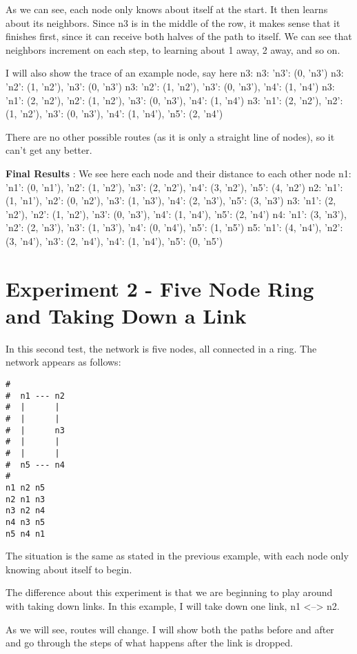 \documentclass[fleqn,11pt]{article}
\begin{document}
As we can see, each node only knows about itself at the start. It then learns about its neighbors. Since n3 is in the middle of the row, it makes sense that it finishes first, since it can receive both halves of the path to itself. We can see that neighbors increment on each step, to learning about 1 away, 2 away, and so on.

I will also show the trace of an example node, say here n3:
n3: {'n3': (0, 'n3')}
n3: {'n2': (1, 'n2'), 'n3': (0, 'n3')}
n3: {'n2': (1, 'n2'), 'n3': (0, 'n3'), 'n4': (1, 'n4')}
n3: {'n1': (2, 'n2'), 'n2': (1, 'n2'), 'n3': (0, 'n3'), 'n4': (1, 'n4')}
n3: {'n1': (2, 'n2'), 'n2': (1, 'n2'), 'n3': (0, 'n3'), 'n4': (1, 'n4'), 'n5': (2, 'n4')}

There are no other possible routes (as it is only a straight line of nodes), so it can't get any better.

\textbf{Final Results} : We see here each node and their distance to each other node
n1: {'n1': (0, 'n1'), 'n2': (1, 'n2'), 'n3': (2, 'n2'), 'n4': (3, 'n2'), 'n5': (4, 'n2')}
n2: {'n1': (1, 'n1'), 'n2': (0, 'n2'), 'n3': (1, 'n3'), 'n4': (2, 'n3'), 'n5': (3, 'n3')}
n3: {'n1': (2, 'n2'), 'n2': (1, 'n2'), 'n3': (0, 'n3'), 'n4': (1, 'n4'), 'n5': (2, 'n4')}
n4: {'n1': (3, 'n3'), 'n2': (2, 'n3'), 'n3': (1, 'n3'), 'n4': (0, 'n4'), 'n5': (1, 'n5')}
n5: {'n1': (4, 'n4'), 'n2': (3, 'n4'), 'n3': (2, 'n4'), 'n4': (1, 'n4'), 'n5': (0, 'n5')}

\section{Experiment 2 - Five Node Ring and Taking Down a Link}

In this second test, the network is five nodes, all connected in a ring. The network appears as follows:
\begin{lstlisting}
#
#  n1 --- n2
#  |      |
#  |      |
#  |      n3
#  |      |   
#  |      |
#  n5 --- n4
# 
n1 n2 n5
n2 n1 n3
n3 n2 n4
n4 n3 n5
n5 n4 n1
\end{lstlisting}

The situation is the same as stated in the previous example, with each node only knowing about itself to begin. 

The difference about this experiment is that we are beginning to play around with taking down links. In this example, I will take down one link, n1 <--> n2.

As we will see, routes will change. I will show both the paths before and after and go through the steps of what happens after the link is dropped.
\end{document}
